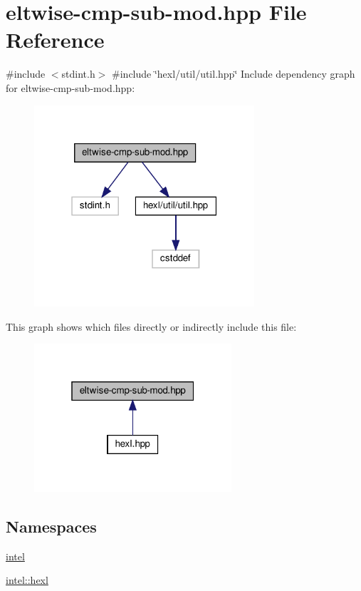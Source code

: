 \hypertarget{eltwise-cmp-sub-mod_8hpp}{}\section{eltwise-\/cmp-\/sub-\/mod.hpp File Reference}
\label{eltwise-cmp-sub-mod_8hpp}
{\ttfamily \#include $<$stdint.\+h$>$}\newline
{\ttfamily \#include \char`\"{}hexl/util/util.\+hpp\char`\"{}}\newline
Include dependency graph for eltwise-\/cmp-\/sub-\/mod.hpp\+:
\nopagebreak
\begin{figure}[H]
\begin{center}
\leavevmode
\includegraphics[width=232pt]{eltwise-cmp-sub-mod_8hpp__incl}
\end{center}
\end{figure}
This graph shows which files directly or indirectly include this file\+:
\nopagebreak
\begin{figure}[H]
\begin{center}
\leavevmode
\includegraphics[width=208pt]{eltwise-cmp-sub-mod_8hpp__dep__incl}
\end{center}
\end{figure}
\subsection*{Namespaces}
\begin{DoxyCompactItemize}
\item 
 \hyperlink{namespaceintel}{intel}
\item 
 \hyperlink{namespaceintel_1_1hexl}{intel\+::hexl}
\end{DoxyCompactItemize}
